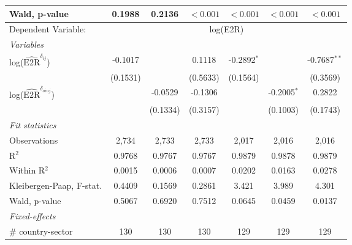 \documentclass[a4paper]{article}
\begin{document}
\begin{table}[h!]
\begin{tabular}{lcccccc}
       Wald, p-value & 0.1988                & 0.2136                 & $<0.001$  & $<0.001$  & $<0.001$   & $<0.001$ \\ 
      \midrule
            Dependent Variable: & \multicolumn{6}{c}{log(E2R)}\\ \cmidrule(lr){2-7}
       \emph{Variables}\\
      log($\hat{\text{E2R}}^{\delta_{ij}}$)        & -0.1017               &                        & 0.1118                & -0.2892$^{*}$         &                        & -0.7687$^{**}$\\   
                                & (0.1531)              &                        & (0.5633)              & (0.1564)              &                        & (0.3569)\\   
      log($\hat{\text{E2R}}^{\delta_{oiuj}}$)             &                       & -0.0529                & -0.1306               &                       & -0.2005$^{*}$          & 0.2822\\   
                                &                       & (0.1334)               & (0.3157)              &                       & (0.1003)               & (0.1743)\\  
      \emph{Fit statistics}\\
      Observations              & 2,734                 & 2,733                  & 2,733                 & 2,017                 & 2,016                  & 2,016\\  
      R$^2$                     & 0.9768                & 0.9767                 & 0.9767                & 0.9879                & 0.9878                 & 0.9879\\  
      Within R$^2$              & 0.0015                & 0.0006                 & 0.0007                & 0.0202                & 0.0163                 & 0.0278\\  
      Kleibergen-Paap, F-stat.                     & 0.4409                & 0.1569                 & 0.2861                & 3.421                 & 3.989                  & 4.301\\
      Wald, p-value & 0.5067                & 0.6920                 & 0.7512                & 0.0645                & 0.0459                 & 0.0137\\ 
      \midrule
      \emph{Fixed-effects}\\
      \# country-sector         & 130                   & 130                    & 130                    & 129                    & 129                    & 129\\  

\end{tabular}
\end{table}
\end{document}
